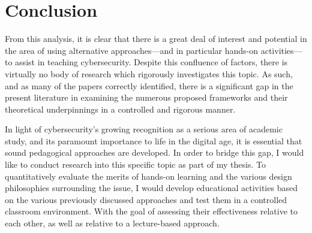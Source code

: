 \documentclass{article}
\begin{document}
\section{Conclusion}

    From this analysis, it is clear that there is a great deal of interest and potential in the area of using alternative approaches---and in particular hands-on activities---to assist in teaching cybersecurity. Despite this confluence of factors, there is virtually no body of research which rigorously investigates this topic. As such, and as many of the papers correctly identified, there is a significant gap in the present literature in examining the numerous proposed frameworks and their theoretical underpinnings in a controlled and rigorous manner. 

    In light of cybersecurity’s growing recognition as a serious area of academic study, and its paramount importance to life in the digital age, it is essential that sound pedagogical approaches are developed. In order to bridge this gap, I would like to conduct research into this specific topic as part of my thesis. To quantitatively evaluate the merits of hands-on learning and the various design philosophies surrounding the issue, I would develop educational activities based on the various previously discussed approaches and test them in a controlled classroom environment. With the goal of assessing their effectiveness relative to each other, as well as relative to a lecture-based approach. 

\printbibliography
\end{document}
